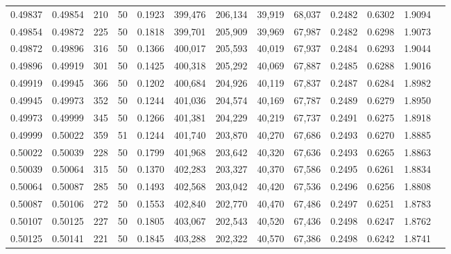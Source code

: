 \begin{tabular}{rrrrrrrrrrrrr}
0.49837 & 0.49854 &   210 &  50 &                                     0.1923 & 399,476 & 206,134 &  39,919 &  68,037 & 0.2482 & 0.6302 & 1.9094 \\
0.49854 & 0.49872 &   225 &  50 &                                     0.1818 & 399,701 & 205,909 &  39,969 &  67,987 & 0.2482 & 0.6298 & 1.9073 \\
0.49872 & 0.49896 &   316 &  50 &                                     0.1366 & 400,017 & 205,593 &  40,019 &  67,937 & 0.2484 & 0.6293 & 1.9044 \\
0.49896 & 0.49919 &   301 &  50 &                                     0.1425 & 400,318 & 205,292 &  40,069 &  67,887 & 0.2485 & 0.6288 & 1.9016 \\
0.49919 & 0.49945 &   366 &  50 &                                     0.1202 & 400,684 & 204,926 &  40,119 &  67,837 & 0.2487 & 0.6284 & 1.8982 \\
0.49945 & 0.49973 &   352 &  50 &                                     0.1244 & 401,036 & 204,574 &  40,169 &  67,787 & 0.2489 & 0.6279 & 1.8950 \\
0.49973 & 0.49999 &   345 &  50 &                                     0.1266 & 401,381 & 204,229 &  40,219 &  67,737 & 0.2491 & 0.6275 & 1.8918 \\
0.49999 & 0.50022 &   359 &  51 &                                     0.1244 & 401,740 & 203,870 &  40,270 &  67,686 & 0.2493 & 0.6270 & 1.8885 \\
0.50022 & 0.50039 &   228 &  50 &                                     0.1799 & 401,968 & 203,642 &  40,320 &  67,636 & 0.2493 & 0.6265 & 1.8863 \\
0.50039 & 0.50064 &   315 &  50 &                                     0.1370 & 402,283 & 203,327 &  40,370 &  67,586 & 0.2495 & 0.6261 & 1.8834 \\
0.50064 & 0.50087 &   285 &  50 &                                     0.1493 & 402,568 & 203,042 &  40,420 &  67,536 & 0.2496 & 0.6256 & 1.8808 \\
0.50087 & 0.50106 &   272 &  50 &                                     0.1553 & 402,840 & 202,770 &  40,470 &  67,486 & 0.2497 & 0.6251 & 1.8783 \\
0.50107 & 0.50125 &   227 &  50 &                                     0.1805 & 403,067 & 202,543 &  40,520 &  67,436 & 0.2498 & 0.6247 & 1.8762 \\
0.50125 & 0.50141 &   221 &  50 &                                     0.1845 & 403,288 & 202,322 &  40,570 &  67,386 & 0.2498 & 0.6242 & 1.8741 \\

\end{tabular}
